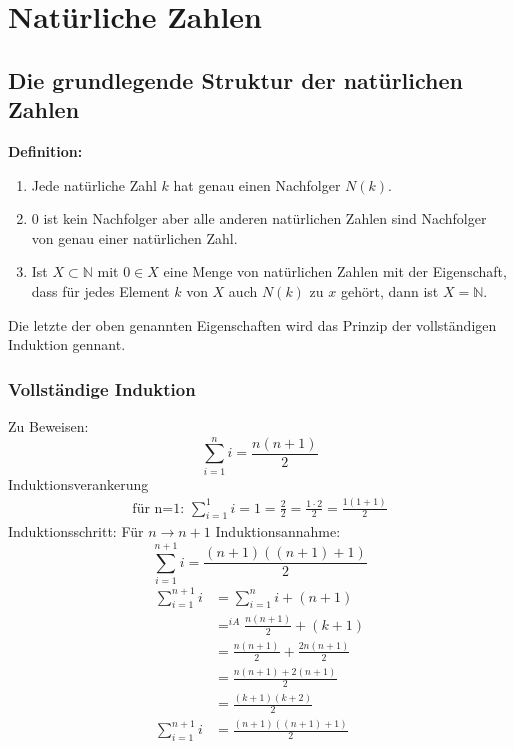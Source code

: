 \chapter{Natürliche Zahlen} %
\label{cha:natürliche_zahlen}

\section{Die grundlegende Struktur der natürlichen Zahlen} %
\label{sec:die_grundlegende_struktur_der_natürlichen_zahlen}
\textbf{Definition:} 
\begin{enumerate}
	\item Jede natürliche Zahl \(k\) hat genau einen Nachfolger \(N(k)\).
	\item 0 ist kein Nachfolger aber alle anderen natürlichen Zahlen sind Nachfolger von genau einer natürlichen Zahl.
	\item Ist \(X \subset \mathbb{N}\) mit \(0 \in X\) eine Menge von natürlichen Zahlen mit der Eigenschaft, dass für jedes Element \(k\) von \(X\) auch \(N(k)\) zu \(x\) gehört, dann ist \(X = \mathbb{N}\).
\end{enumerate}
Die letzte der oben genannten Eigenschaften wird das Prinzip der vollständigen Induktion gennant.
\subsection{Vollständige Induktion} %
\label{sub:vollständige_induktion}
Zu Beweisen:\[\sum_{i=1}^n i = \frac{n(n+1)}{2} \]
Induktionsverankerung
\begin{align*}
	\text{für n=1: } \sum_{i=1}^1 i = 1 = \frac{2}{2} = \frac{1\cdot2}{2} = \frac{1(1+1)}{2}
\end{align*}
Induktionsschritt: Für \(n \rightarrow n+1\) \newline
Induktionsannahme:
\[ \sum_{i=1}^{n+1} i = \frac{(n+1)((n+1)+1)}{2} \]
\begin{align*}
	\sum_{i=1}^{n+1} i &= \sum_{i=1}^{n} i + (n+1) \\
	&=^{iA} \frac{n(n+1)}{2} + (k+1) \\
	&= \frac{n(n+1)}{2} +  \frac{2n(n+1)}{2} \\
	&= \frac{n(n+1)+2(n+1)}{2} \\
	&= \frac{(k+1)(k+2)}{2} \\
	\sum_{i=1}^{n+1} i &= \frac{(n+1)((n+1)+1)}{2}
\end{align*}

